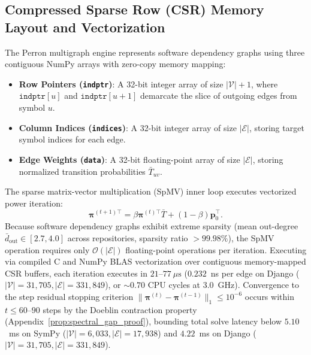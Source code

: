 \documentclass[10pt]{article}
\begin{document}
\subsection{Compressed Sparse Row (CSR) Memory Layout and Vectorization}
The Perron multigraph engine represents software dependency graphs using three contiguous NumPy arrays with zero-copy memory mapping:
\begin{itemize}[noitemsep,topsep=2pt,parsep=0pt,partopsep=0pt]
    \item \textbf{Row Pointers (\texttt{indptr})}: A 32-bit integer array of size $|\mathcal{V}| + 1$, where $\texttt{indptr}[u]$ and $\texttt{indptr}[u+1]$ demarcate the slice of outgoing edges from symbol $u$.
    \item \textbf{Column Indices (\texttt{indices})}: A 32-bit integer array of size $|\mathcal{E}|$, storing target symbol indices for each edge.
    \item \textbf{Edge Weights (\texttt{data})}: A 32-bit floating-point array of size $|\mathcal{E}|$, storing normalized transition probabilities $\bar{T}_{uv}$.
\end{itemize}
The sparse matrix-vector multiplication (SpMV) inner loop executes vectorized power iteration:
\begin{equation}
\boldsymbol{\pi}^{(t+1)\top} = \beta \boldsymbol{\pi}^{(t)\top} \bar{T} + (1 - \beta) \mathbf{p}_0^\top.
\end{equation}
Because software dependency graphs exhibit extreme sparsity (mean out-degree $\bar{d}_{\text{out}} \in [2.7, 4.0]$ across repositories, sparsity ratio $> 99.98\%$), the SpMV operation requires only $\mathcal{O}(|\mathcal{E}|)$ floating-point operations per iteration. Executing via compiled C and NumPy BLAS vectorization over contiguous memory-mapped CSR buffers, each iteration executes in $21\text{--}77~\mu\text{s}$ ($0.232$~ns per edge on Django ($|\mathcal{V}|=31{,}705, |\mathcal{E}|=331{,}849$), or $\sim 0.70$ CPU cycles at 3.0~GHz). Convergence to the step residual stopping criterion $\|\boldsymbol{\pi}^{(t)} - \boldsymbol{\pi}^{(t-1)}\|_1 \le 10^{-6}$ occurs within $t \le 60\text{--}90$ steps by the Doeblin contraction property (Appendix~\ref{prop:spectral_gap_proof}), bounding total solve latency below $5.10$~ms on SymPy ($|\mathcal{V}|=6{,}033, |\mathcal{E}|=17{,}938$) and $4.22$~ms on Django ($|\mathcal{V}|=31{,}705, |\mathcal{E}|=331{,}849$).
\end{document}
